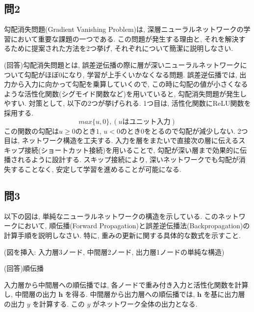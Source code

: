 \documentclass[dvipdfmx, 10pt]{jsarticle}
\begin{document}
\subsection*{問2}
勾配消失問題(Gradient Vanishing Problem)は, 深層ニューラルネットワークの学習において重要な課題の一つである. この問題が発生する理由と, それを解決するために提案された方法を2つ挙げ, それぞれについて簡潔に説明しなさい. 

(回答)勾配消失問題とは, 誤差逆伝播の際に層が深いニューラルネットワークについて勾配がほぼ0になり, 学習が上手くいかなくなる問題. 
誤差逆伝播では, 出力から入力に向かって勾配を乗算していくので, この時に勾配の値が小さくなるような活性化関数(シグモイド関数など)を用いていると, 勾配消失問題が発生しやすい. 
対策として, 以下の2つが挙げられる. 
1つ目は, 活性化関数にReLU関数を採用する. 
$$max\{u, 0\}, (uはユニット入力)$$ 
この関数の勾配は$u\geq0$のとき$1$, $u<0$のとき$0$をとるので勾配が減少しない. 
2つ目は, ネットワーク構造を工夫する. 入力を層をまたいで直接次の層に伝えるスキップ接続(ショートカット接続)を用いることで, 勾配が深い層まで効果的に伝播されるように設計する. 
スキップ接続により, 深いネットワークでも勾配が消失することなく, 安定して学習を進めることが可能になる. 

\subsection*{問3}
以下の図は, 単純なニューラルネットワークの構造を示している. このネットワークにおいて, 順伝播(Forward Propagation)と誤差逆伝播法(Backpropagation)の計算手順を説明しなさい. 特に, 重みの更新に関する具体的な数式を示すこと. 

\begin{center}
(図を挿入: 入力層3ノード, 中間層2ノード, 出力層1ノードの単純な構造)
\end{center}

(回答)順伝播

入力層から中間層への順伝播では, 各ノードで重み付き入力と活性化関数を計算し, 中間層の出力 $\mathbf{h}$ を得る. 
中間層から出力層への順伝播では, $\mathbf{h}$ を基に出力層の出力 $y$ を計算する. 
この $y$ がネットワーク全体の出力となる. 
\end{document}
